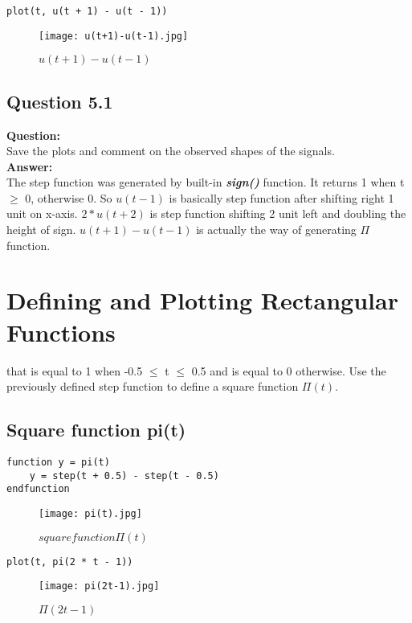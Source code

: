 \documentclass[12pt,fleqn]{article}
\begin{document}
\begin{lstlisting}[frame=single]
plot(t, u(t + 1) - u(t - 1))
\end{lstlisting}
\begin{figure}[H]
\centering
\texttt{[image: u(t+1)-u(t-1).jpg]}
\caption{$u(t+1)-u(t-1)$}
\end{figure}
\subsection{Question 5.1}
\textbf{Question:}\\
Save the plots and comment on the observed shapes of the signals.\\
\textbf{Answer:}\\
The step function was generated by built-in \emph{\textbf{sign()}} function. It returns 1 when t $\geq$ 0, otherwise 0. So $u(t-1)$ is basically step function after shifting right 1 unit on x-axis. $2*u(t+2)$ is step function shifting 2 unit left and doubling the height of sign. $u(t+1)-u(t-1)$ is actually the way of generating $\Pi$ function. 

\section{Defining and Plotting Rectangular Functions}that is equal to 1 when -0.5 $\leq$ t $\leq$ 0.5 and is equal to 0 otherwise. Use the previously defined step function to define a square function $\Pi(t)$. 
\subsection{Square function pi(t)}
\begin{lstlisting}[frame=single]
function y = pi(t)
    y = step(t + 0.5) - step(t - 0.5)
endfunction
\end{lstlisting}
\begin{figure}[H]
\centering
\texttt{[image: pi(t).jpg]}
\caption{$square function \Pi(t)$}
\end{figure}

\begin{lstlisting}[frame=single]
plot(t, pi(2 * t - 1))
\end{lstlisting}
\begin{figure}[H]
\centering
\texttt{[image: pi(2t-1).jpg]}
\caption{$\Pi(2t-1)$}
\end{figure}
\end{document}

